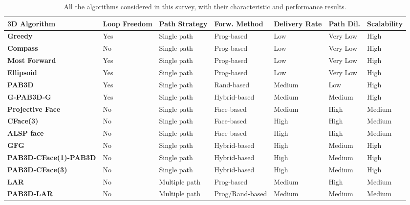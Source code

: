 \documentclass[journal,comsoc]{IEEEtran}
\begin{document}
\begin{table}[ht!]
\center
\small
\caption{All the algorithms considered in this survey, with their characteristic and performance results.}
\label{tab:tax}
\hspace*{-1.8cm}
\begin{adjustbox}{max width=1.3\textwidth}

\begin{tabular}{|l|l|l|l|l|l|l|}

\hline
\textbf{3D Algorithm} & \textbf{Loop Freedom} & \textbf{Path Strategy} & \textbf{Forw. Method} & \textbf{Delivery Rate} & \textbf{Path Dil.} & \textbf{Scalability} \\
\hline
\hline
\textbf{Greedy} & Yes & Single path & Prog-based & Low & Very Low & High \\
\hline
\textbf{Compass} & No & Single path & Prog-based  & Low & Very Low & High \\
\hline
\textbf{Most Forward} & Yes & Single path & Prog-based & Low & Very Low & High \\
\hline
\textbf{Ellipsoid} & Yes & Single path & Prog-based & Low & Very Low & High \\
\hline
\textbf{PAB3D} & Yes & Single path & Rand-based & Medium & Low & High \\
\hline
\textbf{G-PAB3D-G} & Yes & Single path & Hybrid-based & Medium & Medium & High \\
\hline
\textbf{Projective Face} & No & Single path & Face-based & Medium & High & Medium \\
\hline
\textbf{CFace(3)} & No & Single path & Face-based & High & High & Medium \\
\hline
\textbf{ALSP face} & No & Single path & Face-based & High & High & Medium \\
\hline
\textbf{GFG} & No & Single path & Hybrid-based & High & Medium & High \\
\hline
\textbf{PAB3D-CFace(1)-PAB3D} & No & Single path & Hybrid-based & High & Medium & High \\
\hline
\textbf{PAB3D-CFace(3)} & No & Single path & Hybrid-based & High & Medium & High \\
\hline
\textbf{LAR} & No & Multiple path & Prog-based & Medium & High & Medium \\
\hline
\textbf{PAB3D-LAR} & No & Multiple path & Prog/Rand-based & Medium & Medium & Medium \\
\hline
\end{tabular}
\end{adjustbox}

\end{table}
\end{document}
